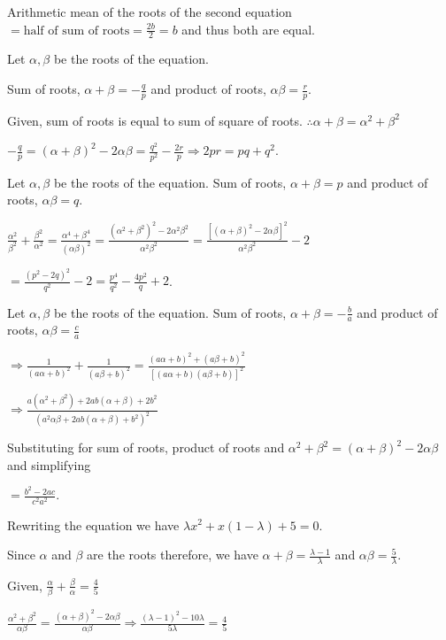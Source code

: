   Arithmetic mean of the roots of the second equation $= \text{half of sum of roots} = \frac{2b}{2} = b$ and
  thus both are equal.
\item Let $\alpha, \beta$ be the roots of the equation.

  Sum of roots, $\alpha + \beta = -\frac{q}{p}$ and product of roots, $\alpha\beta = \frac{r}{p}$.

  Given, sum of roots is equal to sum of square of roots. $\therefore \alpha + \beta = \alpha^2 + \beta^2$

  $-\frac{q}{p} = (\alpha + \beta)^2 - 2\alpha\beta = \frac{q^2}{p^2} - \frac{2r}{p}\Rightarrow 2pr = pq +
  q^2$.
\item Let $\alpha, \beta$ be the roots of the equation. Sum of roots, $\alpha + \beta = p$ and product of
  roots, $\alpha\beta = q$.

  $\frac{\alpha^2}{\beta^2} + \frac{\beta^2}{\alpha^2} = \frac{\alpha^4 + \beta^4}{(\alpha\beta)^2} =
  \frac{(\alpha^2 + \beta^2)^2 - 2\alpha^2\beta^2}{\alpha^2\beta^2} = \frac{[(\alpha + \beta)^2 -
      2\alpha\beta]^2}{\alpha^2\beta^2} - 2$

  $= \frac{(p^2 - 2q)^2}{q^2} - 2 = \frac{p^4}{q^2} - \frac{4p^2}{q} + 2$.
\item Let $\alpha, \beta$ be the roots of the equation. Sum of roots, $\alpha + \beta = -\frac{b}{a}$ and
  product of roots, $\alpha\beta = \frac{c}{a}$

  $\Rightarrow \frac{1}{(a\alpha + b)^2} + \frac{1}{(a\beta + b)^2} = \frac{(a\alpha + b)^2 + (a\beta +
    b)^2}{[(a\alpha + b)(a\beta + b)]^2}$

  $\Rightarrow \frac{a(\alpha^2 + \beta^2) + 2ab(\alpha + \beta) + 2b^2}{(a^2\alpha\beta + 2ab(\alpha +
    \beta) + b^2)^2}$

  Substituting for sum of roots, product of roots and $\alpha^2 + \beta^2 = (\alpha + \beta)^2 -
  2\alpha\beta$ and simplifying

  $= \frac{b^2 - 2ac}{c^2a^2}$.
\item Rewriting the equation we have $\lambda x^2 + x(1 - \lambda) + 5 = 0$.

  Since $\alpha$ and $\beta$ are the roots therefore, we have $\alpha + \beta = \frac{\lambda - 1}{\lambda}$
  and $\alpha\beta = \frac{5}{\lambda}$.

  Given, $\frac{\alpha}{\beta} + \frac{\beta}{\alpha} = \frac{4}{5}$

  $\frac{\alpha^2 + \beta^2}{\alpha\beta} = \frac{(\alpha + \beta)^2 - 2\alpha\beta}{\alpha\beta}\Rightarrow
  \frac{(\lambda - 1)^2 - 10\lambda}{5\lambda} = \frac{4}{5}$

